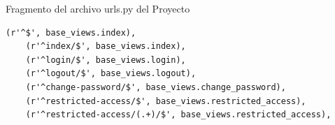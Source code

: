 Fragmento del archivo urls.py del Proyecto\\[0.1cm]

\begin{lstlisting}[style=HTML]
    (r'^$', base_views.index),
    (r'^index/$', base_views.index),
    (r'^login/$', base_views.login),
    (r'^logout/$', base_views.logout),
    (r'^change-password/$', base_views.change_password),
    (r'^restricted-access/$', base_views.restricted_access),
    (r'^restricted-access/(.+)/$', base_views.restricted_access),
\end{lstlisting}

\vspace{0.1cm}

